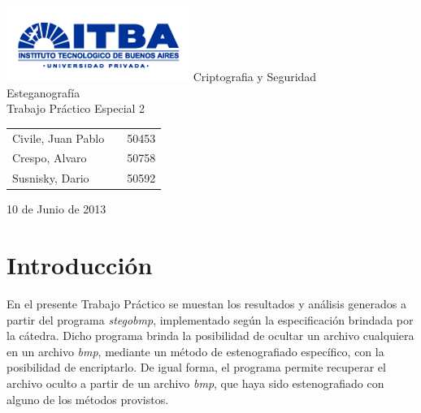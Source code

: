 \documentclass[a4paper,10pt]{article}
\begin{document}
\setcounter{secnumdepth}{5}
\setcounter{tocdepth}{5}

\begin{titlepage}
        \vfill
        \thispagestyle{empty}
        \begin{center}
                \includegraphics{./images/itba_logo.png}
                \vfill
                \Huge{Criptografia y Seguridad}\\
                \vspace{1cm}
                \Huge{Esteganografía}\\
                \vspace{1cm}
                \Huge{Trabajo Pr\'actico Especial 2}\\
        \end{center}
        \vfill
        \large{
        \begin{tabular}{lcr}
                Civile, Juan Pablo && 50453\\
                Crespo, Alvaro && 50758 \\
                Susnisky, Dario && 50592\\
        \end{tabular}
}
        \vspace{2cm}
        \begin{center}
                \large{10 de Junio de 2013}\\
        \end{center}
\end{titlepage}
\newpage

\setcounter{page}{1}

\section{Introducción}

En el presente Trabajo Práctico se muestan los resultados y análisis generados a partir del programa \textit{stegobmp}, implementado según la especificación
brindada por la cátedra. Dicho programa brinda la posibilidad de ocultar un archivo cualquiera en un archivo \textit{bmp}, mediante un método de estenografiado específico, 
con la posibilidad de encriptarlo. De igual forma, el programa permite recuperar el archivo oculto a partir de un archivo \textit{bmp}, que haya sido estenografiado con alguno 
de los métodos provistos.\\
\end{document}
